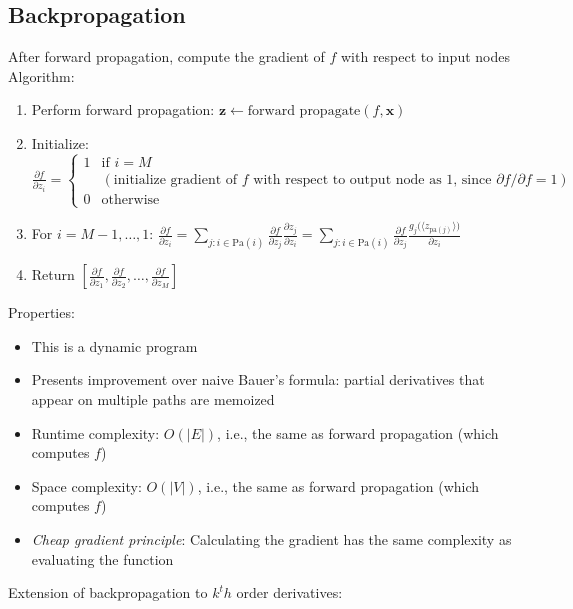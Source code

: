 \subsection*{Backpropagation}
After forward propagation, compute the gradient of $f$ with respect to input nodes\\
Algorithm:
\begin{enumerate}
    \item Perform forward propagation: $\boldsymbol{z} \gets \textrm{forward propagate}(f, \boldsymbol{x})$
    \item Initialize:
    $
    \frac{\partial f}{\partial z_i} =
    \begin{cases}
    1 & \textrm{if } i = M\\
     & (\textrm{initialize gradient of } f \textrm{ with respect to output node as 1, since } \partial f / \partial f = 1)\\
    0 & \textrm{otherwise}
    \end{cases}
    $
    \item For $i = M-1, \dots, 1$:
    $
    \frac{\partial f}{\partial z_i} = \sum_{j:i \in \textrm{Pa}(i)} \frac{\partial f}{\partial z_j} \frac{\partial z_j}{\partial z_i} = \sum_{j:i \in \textrm{Pa}(i)} \frac{\partial f}{\partial z_j} \frac{g_j\big(\langle z_{\textrm{pa}(j)} \rangle\big)}{\partial z_i}
    $
    \item Return $\left[ \frac{\partial f}{\partial z_1}, \frac{\partial f}{\partial z_2}, \dots, \frac{\partial f}{\partial z_M} \right]$
\end{enumerate}
Properties:
\begin{itemize}
    \item This is a dynamic program
    \item Presents improvement over naive Bauer's formula: partial derivatives that appear on multiple paths are memoized
    \item Runtime complexity: $O(|E|)$, i.e., the same as forward propagation (which computes $f$)
    \item Space complexity: $O(|V|)$, i.e., the same as forward propagation (which computes $f$)
    \item \emph{Cheap gradient principle}: Calculating the gradient has the same complexity as evaluating the function
\end{itemize}
Extension of backpropagation to $k^th$ order derivatives:
